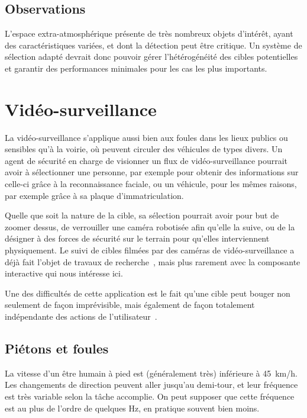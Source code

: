 	\addtocounter{footnote}{-2}
	\addtocounter{footnote}{1}
	\addtocounter{footnote}{1}
	
	\subsection{Observations}
	L'espace extra-atmosphérique présente de très nombreux objets d'intérêt, ayant des caractéristiques variées, et dont la détection peut être critique. Un système de sélection adapté devrait donc pouvoir gérer l'hétérogénéité des cibles potentielles et garantir des performances minimales pour les cas les plus importants.	
	
	\section{Vidéo-surveillance}
	La vidéo-surveillance s'applique aussi bien aux foules dans les lieux publics ou sensibles qu'à la voirie, où peuvent circuler des véhicules de types divers. Un agent de sécurité en charge de visionner un flux de vidéo-surveillance pourrait avoir à sélectionner une personne, par exemple pour obtenir des informations sur celle-ci grâce à la reconnaissance faciale, ou un véhicule, pour les mêmes raisons, par exemple grâce à sa plaque d'immatriculation.
	
	Quelle que soit la nature de la cible, sa sélection pourrait avoir pour but de zoomer dessus, de verrouiller une caméra robotisée afin qu'elle la suive, ou de la désigner à des forces de sécurité sur le terrain pour qu'elles interviennent physiquement. Le suivi de cibles filmées par des caméras de vidéo-surveillance a déjà fait l'objet de travaux de recherche~\cite{lipton1998moving, nishimura1997video, benfold2011stable}, mais plus rarement avec la composante interactive qui nous intéresse ici.
	
	Une des difficultés de cette application est le fait qu'une cible peut bouger non seulement de façon imprévisible, mais également de façon totalement indépendante des actions de l'utilisateur~\cite{ilich2010moving, silva2012real}.	
	
	\FloatBarrier \subsection{Piétons et foules}
	La vitesse d'un être humain à pied est (généralement très) inférieure à 45~km/h. Les changements de direction peuvent aller jusqu'au demi-tour, et leur fréquence est très variable selon la tâche accomplie. On peut supposer que cette fréquence est au plus de l'ordre de quelques Hz, en pratique souvent bien moins.
	

